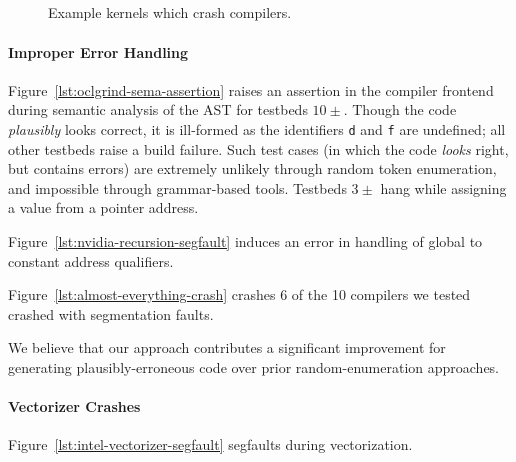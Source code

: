 \begin{figure}
  \centering %
  \\%
  \\%
  \\%
  \\%
  \caption{Example kernels which crash compilers.}%
  \label{lst:compiler-crashes}%
\end{figure}

\paragraph{Improper Error Handling} Figure~\ref{lst:oclgrind-sema-assertion} raises an assertion in the compiler frontend during semantic analysis of the AST for testbeds $10\pm$. Though the code \emph{plausibly} looks correct, it is ill-formed as the identifiers \texttt{d} and \texttt{f} are undefined; all other testbeds raise a build failure. Such test cases (in which the code \emph{looks} right, but contains errors) are extremely unlikely through random token enumeration, and impossible through grammar-based tools. Testbeds $3\pm$ hang while assigning a value from a pointer address.

Figure~\ref{lst:nvidia-recursion-segfault} induces an error in handling of global to constant address qualifiers.

Figure~\ref{lst:almost-everything-crash} crashes 6 of the 10 compilers we tested crashed with segmentation faults.

We believe that our approach contributes a significant improvement for generating plausibly-erroneous code over prior random-enumeration approaches.

\paragraph{Vectorizer Crashes} Figure~\ref{lst:intel-vectorizer-segfault} segfaults during vectorization. 


